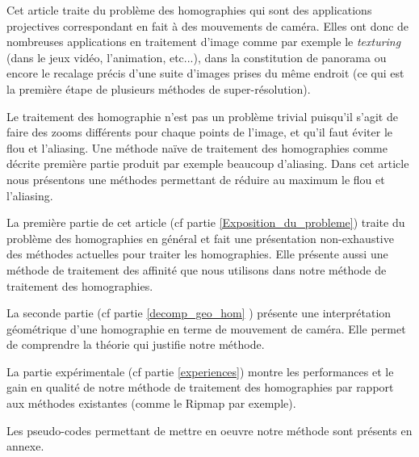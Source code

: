 	Cet article traite du problème des homographies qui sont des applications projectives correspondant en fait à des mouvements de caméra. Elles ont donc de nombreuses applications en traitement d'image comme par exemple le \emph{texturing} (dans le jeux vidéo, l'animation, etc...), dans la constitution de panorama \cite{brown2007automatic} ou encore le recalage précis d'une suite d'images prises du même endroit (ce qui est la première étape de plusieurs méthodes de super-résolution).

	Le traitement des homographie n'est pas un problème trivial puisqu'il s'agit de faire des zooms différents pour chaque points de l'image, et qu'il faut éviter le flou et l'aliasing. Une méthode naïve de traitement des homographies comme décrite première partie produit par exemple beaucoup d'aliasing. Dans cet article nous présentons une méthodes permettant de réduire au maximum le flou et l'aliasing.

	La première partie de cet article (cf partie \ref{Exposition_du_probleme}) traite du problème des homographies en général et fait une présentation non-exhaustive des méthodes actuelles pour traiter les homographies. Elle présente aussi une méthode de traitement des affinité que nous utilisons dans notre méthode de traitement des homographies. 

	La seconde partie (cf partie \ref{decomp_geo_hom} ) présente une interprétation géométrique d'une homographie en terme de mouvement de caméra. Elle permet de comprendre la théorie qui justifie notre méthode.

	La partie expérimentale (cf partie \ref{experiences}) montre les performances et le gain en qualité de notre méthode de traitement des homographies par rapport aux méthodes existantes (comme le Ripmap par exemple).

	Les pseudo-codes permettant de mettre en oeuvre notre méthode sont présents en annexe.
